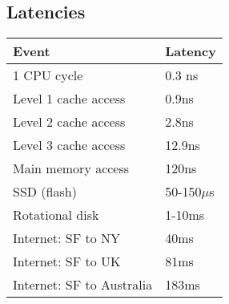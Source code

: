 \subsection{Latencies ~\cite{greg}}
\begin{center}
\begin{tabular}{|l|l|}
\hline
\textbf{Event} & \textbf{Latency} \\
\hline
1 CPU cycle & 0.3 ns \\
\hline
Level 1 cache access & 0.9ns \\
\hline
Level 2 cache access & 2.8ns \\
\hline
Level 3 cache access & 12.9ns \\
\hline
Main memory access & 120ns \\
\hline
SSD (flash)        & 50-150$\mu$s \\
\hline
Rotational disk    & 1-10ms\\
\hline
Internet: SF to NY & 40ms \\
\hline
Internet: SF to UK & 81ms \\
\hline
Internet: SF to Australia & 183ms \\
\hline
\end{tabular}
\end{center}